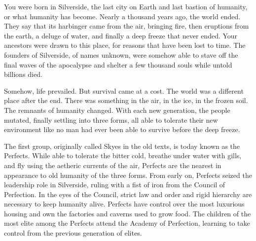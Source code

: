 \documentclass[blue]{Silversiders}
\begin{document}
\name{\bSilversideCity{}}

You were born in Silverside, the last city on Earth and last bastion of humanity, or what humanity has become. Nearly a thousand years ago, the world ended. They say that its harbinger came from the air, bringing fire, then eruptions from the earth, a deluge of water, and finally a deep freeze that never ended. Your ancestors were drawn to this place, for reasons that have been lost to time. The founders of Silverside, of names unknown, were somehow able to stave off the final waves of the apocalypse and shelter a few thousand souls while untold billions died.

Somehow, life prevailed. But survival came at a cost. The world was a different place after the end. There was something in the air, in the ice, in the frozen soil. The remnants of humanity changed. With each new generation, the people mutated, finally settling into three forms, all able to tolerate their new environment like no man had ever been able to survive before the deep freeze.

The first group, originally called Skyes in the old texts, is today known as the Perfects. While able to tolerate the bitter cold, breathe under water with gills, and fly using the aetheric currents of the air, Perfects are the nearest in appearance to old humanity of the three forms. From early on, Perfects seized the leadership role in Silverside, ruling with a fist of iron from the Council of Perfection. In the eyes of the Council, strict law and order and rigid hierarchy are necessary to keep humanity alive. Perfects have control over the most luxurious housing and own the factories and caverns used to grow food. The children of the most elite among the Perfects attend the Academy of Perfection, learning to take control from the previous generation of elites.
\end{document}
